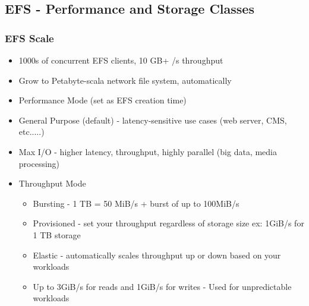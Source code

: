 \subsection{EFS - Performance and Storage Classes}

\subsubsection{EFS Scale}
\begin{itemize}
    \item 1000s of concurrent EFS clients, 10 GB+ /s throughput
    \item Grow to Petabyte-scala network file system, automatically
    \item Performance Mode (set as EFS creation time)
    \item General Purpose (default) - latency-sensitive use cases (web server, CMS, etc.....)
    \item Max I/O - higher latency, throughput, highly parallel (big data, media processing)
    \item Throughput Mode
    \begin{itemize}
        \item Bursting - 1 TB = 50 MiB/s + burst of up to 100MiB/s
        \item Provisioned - set your throughput regardless of storage size ex: 1GiB/s for 1 TB storage
        \item Elastic - automatically scales throughput up or down based on your workloads
        \item Up to 3GiB/s for reads and 1GiB/s for writes
        - Used for unpredictable workloads
    \end{itemize}
\end{itemize}

